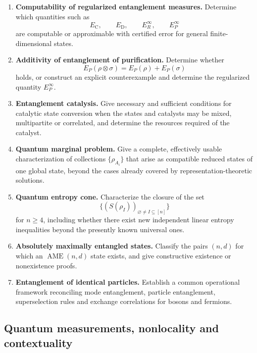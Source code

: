 \documentclass{article}
\begin{document}
\begin{enumerate}[label=\textbf{E\arabic*.},leftmargin=*]
\item \precise{} \textbf{Computability of regularized entanglement measures.}
Determine which quantities such as
\[
 E_{\mathrm C},\qquad E_{\mathrm D},\qquad
 E_R^\infty,\qquad E_P^\infty
\]
are computable or approximable with certified error for general
finite-dimensional states.

\item \precise{} \textbf{Additivity of entanglement of purification.}
Determine whether
\[
    E_P(\rho\otimes\sigma)
      =E_P(\rho)+E_P(\sigma)
\]
holds, or construct an explicit counterexample and determine the
regularized quantity \(E_P^\infty\).

\item \precise{} \textbf{Entanglement catalysis.}
Give necessary and sufficient conditions for catalytic state conversion
when the states and catalysts may be mixed, multipartite or correlated,
and determine the resources required of the catalyst.

\item \precise{} \textbf{Quantum marginal problem.}
Give a complete, effectively usable characterization of collections
\(\{\rho_{A_i}\}\) that arise as compatible reduced states of one global
state, beyond the cases already covered by representation-theoretic
solutions.

\item \precise{} \textbf{Quantum entropy cone.}
Characterize the closure of the set
\[
 \bigl\{(S(\rho_I))_{\varnothing\neq I\subseteq[n]}\bigr\}
\]
for \(n\geq4\), including whether there exist new independent linear
entropy inequalities beyond the presently known universal ones.

\item \precise{} \textbf{Absolutely maximally entangled states.}
Classify the pairs \((n,d)\) for which an
\(\operatorname{AME}(n,d)\) state exists, and give constructive
existence or nonexistence proofs.

\item \formalism{} \textbf{Entanglement of identical particles.}
Establish a common operational framework reconciling mode
entanglement, particle entanglement, superselection rules and
exchange correlations for bosons and fermions.

\end{enumerate}


\subsection{Quantum measurements, nonlocality and contextuality}
\end{document}

